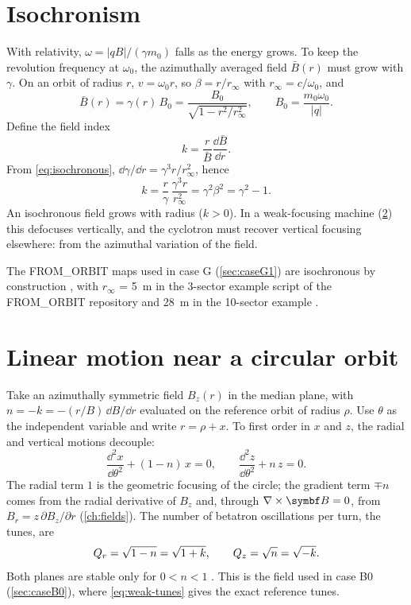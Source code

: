 \section{Isochronism}
With relativity, $\omega = |qB|/(\gamma m_0)$ falls as the energy grows.
To keep the revolution frequency at $\omega_0$, the azimuthally averaged field $\bar B(r)$ must grow with $\gamma$.
On an orbit of radius $r$, $v = \omega_0 r$, so $\beta = r/r_\infty$ with $r_\infty = c/\omega_0$, and
\begin{equation}
\bar B(r) = \gamma(r)\, B_0 = \frac{B_0}{\sqrt{1-r^2/r_\infty^2}},\qquad B_0 = \frac{m_0\omega_0}{|q|}.
\label{eq:isochronous}
\end{equation}
Define the field index
\begin{equation}
k = \frac{r}{\bar B}\frac{\dd \bar B}{\dd r}.
\end{equation}
From \cref{eq:isochronous}, $\dd\gamma/\dd r = \gamma^3 r/r_\infty^2$, hence
\begin{equation}
k = \frac{r}{\gamma}\,\frac{\gamma^3 r}{r_\infty^2} = \gamma^2\beta^2 = \gamma^2-1 .
\label{eq:k-isochronous}
\end{equation}
An isochronous field grows with radius ($k>0$).
In a weak-focusing machine (\cref{sec:weak}) this defocuses vertically, and the cyclotron must recover vertical
focusing elsewhere: from the azimuthal variation of the field.

The FROM\_ORBIT maps used in case G (\cref{sec:caseG1}) are isochronous by construction \cite{planche2019}, with
$r_\infty$ = \SI{5}{m} in the 3-sector example script of the FROM\_ORBIT repository and \SI{28}{m} in the 10-sector
example \cite{planche2023}.

\section{Linear motion near a circular orbit}\label{sec:weak}
Take an azimuthally symmetric field $B_z(r)$ in the median plane, with $n = -k = -(r/B)\,\dd B/\dd r$ evaluated on the
reference orbit of radius $\rho$.
Use $\theta$ as the independent variable and write $r = \rho + x$.
To first order in $x$ and $z$, the radial and vertical motions decouple:
\begin{equation}
\frac{\dd^2 x}{\dd\theta^2} + (1-n)\,x = 0,\qquad \frac{\dd^2 z}{\dd\theta^2} + n\,z = 0 .
\end{equation}
The radial term $1$ is the geometric focusing of the circle; the gradient term $\mp n$ comes from the radial derivative
of $B_z$ and, through $\nabla\times\vect B = 0$, from $B_r = z\,\partial B_z/\partial r$ (\cref{ch:fields}).
The number of betatron oscillations per turn, the tunes, are
\begin{equation}
Q_r = \sqrt{1-n} = \sqrt{1+k},\qquad Q_z = \sqrt{n} = \sqrt{-k} .
\label{eq:weak-tunes}
\end{equation}
Both planes are stable only for $0<n<1$ \cite{kerst1941}.
This is the field used in case B0 (\cref{sec:caseB0}), where \cref{eq:weak-tunes} gives the exact reference tunes.

